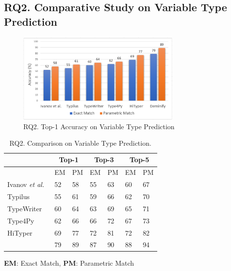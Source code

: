 \subsection{{\bf RQ2. Comparative Study on Variable Type Prediction}}
\label{empirical-rq2}

\begin{figure}[thbp]
\begin{center}
\includegraphics[width=3.2in]{figures/type-prediction-result}
\vspace{-8pt}
\caption{RQ2. Top-1 Accuracy on Variable Type Prediction}
\label{type-prediction-result}
\end{center}
\end{figure}

\begin{table}[htbp]
  \caption{RQ2. Comparison on Variable Type Prediction.}
  \vspace{-5pt}
	\begin{center}
		\small
		\renewcommand{\arraystretch}{1} \begin{tabular}{|p{1.9cm}<{\centering}|p{0.65cm}<{\centering}|p{0.65cm}<{\centering}|p{0.65cm}<{\centering}|p{0.65cm}<{\centering}|p{0.65cm}<{\centering}|p{0.65cm}<{\centering}|}
			
			\hline
                       & \multicolumn{2}{c|}{Top-1}         & \multicolumn{2}{c|}{Top-3}         & \multicolumn{2}{c|}{Top-5} \\
			\hline
                       & EM & PM & EM & PM & EM & PM  \\ 
			\hline
		        Ivanov {\em et al.}~\cite{ivanov21predicting} &  52    & 58     &   55   &  63     &  60     &   67    \\
			Typilus~\cite{typilus-pldi20}  &   55   &  61    &  59    &   66   &  62    &  70     \\
			TypeWriter~\cite{typewriter-fse20}  &   60   &  64    &  63    &  69    &  65    & 71      \\
                       	Type4Py~\cite{Type4Py-icse22}  & 62 & 66 & 66 & 72 & 67 & 73 \\
                        HiTyper~\cite{HiTyper-icse22}  & 69 & 77 & 72 & 81 & 72 & 82 \\
			\hline
			{\bf {\tool}}                        & 79 & 89 & 87 & 90 & 88 & 94 \\
			\hline
		\end{tabular}
		\label{type-result}
		{\bf EM}: Exact Match, {\bf PM}: Parametric Match
	\end{center}
\end{table}


